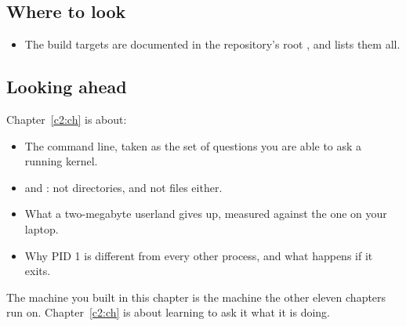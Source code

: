 \subsection*{Where to look}
\begin{itemize}
  \item The build targets are documented in the repository's root , and
     lists them all.
\end{itemize}

\subsection*{Looking ahead}
Chapter~\ref{c2:ch} is about:
\begin{itemize}
  \item The command line, taken as the set of questions you are able to ask a running kernel.
  \item {} and : not directories, and not files either.
  \item What a two-megabyte userland gives up, measured against the one on your laptop.
  \item Why PID 1 is different from every other process, and what happens if it exits.
\end{itemize}
The machine you built in this chapter is the machine the other eleven chapters run on.
Chapter~\ref{c2:ch} is about learning to ask it what it is doing.
